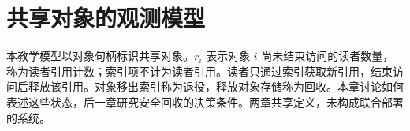 \chapter{共享对象的观测模型}
\label{ch:observation}
本教学模型以对象句柄标识共享对象。$r_i$ 表示对象 $i$ 尚未结束访问的读者数量，称为读者引用计数；索引项不计为读者引用。读者只通过索引获取新引用，结束访问后释放该引用。对象移出索引称为退役，释放对象存储称为回收。本章讨论如何表述这些状态，后一章研究安全回收的决策条件。两章共享定义，未构成联合部署的系统。
